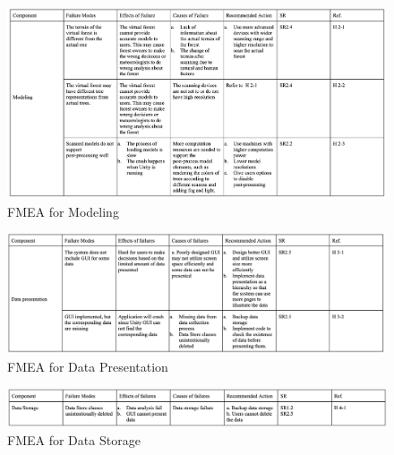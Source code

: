\documentclass{article}
\begin{document}
\begin{figure}[H]
\begin{flushleft}
\begin{center}
    \includegraphics[scale = 0.55]{HA_Pictures/Modeling.png}
\end{center}
    \caption{FMEA for Modeling}
    \end{flushleft}
\end{figure}

\begin{figure}[H]
\begin{flushleft}
\begin{center}
    \includegraphics[scale = 0.55]{HA_Pictures/Data_P.png}
\end{center}
    \caption{FMEA for Data Presentation}
    \end{flushleft}
\end{figure}


\begin{figure}[H]
\begin{flushleft}
\begin{center}
    \includegraphics[scale = 0.55]{HA_Pictures/Data_S.png}
\end{center}
    \caption{FMEA for Data Storage}
    \end{flushleft}
\end{figure}
\end{document}
